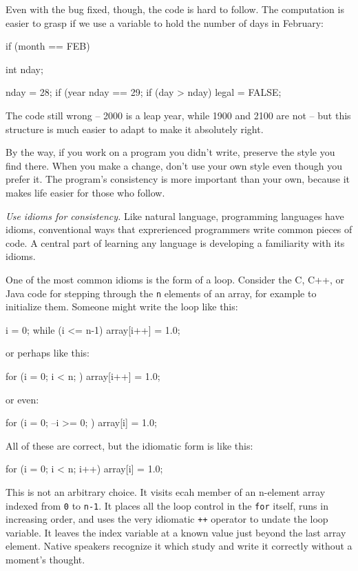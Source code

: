 Even with the bug fixed, though, the code is hard to follow. The
computation is easier to grasp if we use a variable to hold the number of
days in February:
\begin{badcode}
    if (month == FEB) {
        int nday;

        nday = 28;
        if (year%
            nday == 29;
        if (day > nday)
            legal = FALSE;
    }
\end{badcode}
The code still wrong -- 2000 is a leap year, while 1900 and 2100 are not --
but this structure is much easier to adapt to make it absolutely right.

By the way, if you work on a program you didn't write, preserve the style
you find there. When you make a change, don't use your own style even
though you prefer it. The program's consistency is more important than your
own, because it makes life easier for those who follow.

\emph{Use idioms for consistency.} Like natural language, programming
languages have idioms, conventional ways that exprerienced programmers
write common pieces of code. A central part of learning any language is
developing a familiarity with its idioms.

One of the most common idioms is the form of a loop. Consider the C, C++,
or Java code for stepping through the \verb'n' elements of an array, for
example to initialize them. Someone might write the loop like this:
\begin{badcode}
    i = 0;
    while (i <= n-1)
        array[i++] = 1.0;
\end{badcode}
or perhaps like this:
\begin{badcode}
    for (i = 0; i < n; )
        array[i++] = 1.0;
\end{badcode}
or even:
\begin{badcode}
    for (i = 0; --i >= 0; )
        array[i] = 1.0;
\end{badcode}
All of these are correct, but the idiomatic form is like this:
\begin{wellcode}
    for (i = 0; i < n; i++)
        array[i] = 1.0;
\end{wellcode}
This is not an arbitrary choice. It visits ecah member of an n-element
array indexed from \verb'0' to \verb'n-1'. It places all the loop control
in the \verb'for' itself, runs in increasing order, and uses the very
idiomatic \verb'++' operator to undate the loop variable. It leaves the
index variable at a known value just beyond the last array element. Native
speakers recognize it which study and write it correctly without a moment's
thought.

